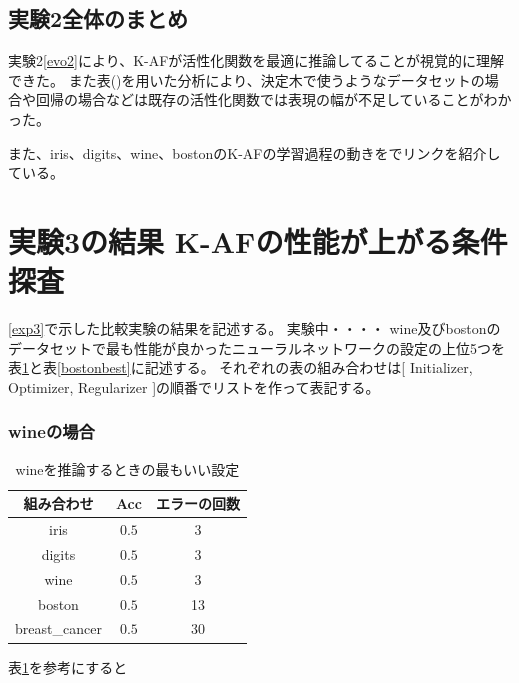 \subsection{実験2全体のまとめ}
実験2\ref{evo2}により、K-AFが活性化関数を最適に推論してることが視覚的に理解できた。
また表(\label{af-class})を用いた分析により、決定木で使うようなデータセットの場合や回帰の場合などは既存の活性化関数では表現の幅が不足していることがわかった。

また、iris、digits、wine、bostonのK-AFの学習過程の動きを\label{appendix:movie}でリンクを紹介している。









\section{実験3の結果 K-AFの性能が上がる条件探査}
\label{evo3}
\ref{exp3}で示した比較実験の結果を記述する。
実験中・・・・
wine及びbostonのデータセットで最も性能が良かったニューラルネットワークの設定の上位5つを表\ref{winebest}と表\ref{bostonbest}に記述する。
それぞれの表の組み合わせは[ Initializer, Optimizer, Regularizer ]の順番でリストを作って表記する。
\subsubsection{wineの場合}

\begin{table}[htbp]
    \begin{center}
        \caption{wineを推論するときの最もいい設定}
        \label{winebest}
        \vspace{2mm} 
        \begin{tabular}{ |c|c|c| }
        組み合わせ & Acc & エラーの回数 \\
        \hline
        iris           & $ 0.5 $    & 3 \\
        digits         & $ 0.5 $    & 3 \\
        wine           & $ 0.5 $    & 3 \\
        boston         & $ 0.5 $    & 13  \\
        breast\_cancer & $ 0.5 $    & 30 \\
        \end{tabular}
    \end{center}
\end{table}

表\ref{winebest}を参考にすると

